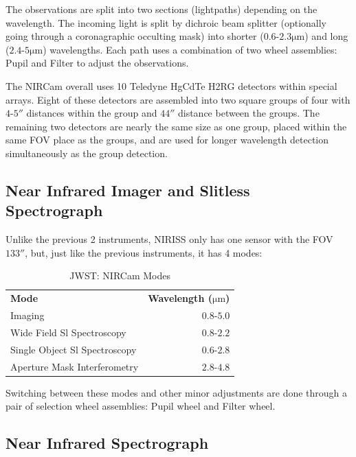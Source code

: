 The observations are split into two sections (lightpaths) depending on the wavelength. The incoming light is split by dichroic beam splitter (optionally going through a coronagraphic occulting mask) into shorter ($0.6 \text{-} 2.3 \unit{\micro\meter}$) and long ($2.4 \text{-} 5 \unit{\micro\meter}$) wavelengths. Each path uses a combination of two wheel assemblies: Pupil and Filter to adjust the observations.

The NIRCam overall uses 10 Teledyne HgCdTe H2RG detectors within special arrays. Eight of these detectors are assembled into two square groups of four with $4\text{-}5''$ distances within the group and $44''$ distance between the groups. The remaining two detectors are nearly the same size as one group, placed within the same FOV place as the groups, and are used for longer wavelength detection simultaneously as the group detection.

\subsection{Near Infrared Imager and Slitless Spectrograph}

Unlike the previous 2 instruments, NIRISS only has one sensor with the FOV $133''$, but, just like the previous instruments, it has 4 modes:

\begin{table}[h]
    \centering
    \begin{tabular}{lr}
        \textbf{Mode} & \textbf{Wavelength ($\unit{\micro\meter}$)}  \\
        Imaging & $0.8 \text{-} 5.0$ \\
        Wide Field Sl Spectroscopy & $0.8 \text{-} 2.2$ \\
        Single Object Sl Spectroscopy & $0.6 \text{-} 2.8$ \\
        Aperture Mask Interferometry  & $2.8 \text{-} 4.8$ \\
    \end{tabular}
    \caption{JWST: NIRCam Modes \cite{JWST_NIRISS}}
    \label{tab:jwst_ote_information}
\end{table}

Switching between these modes and other minor adjustments are done through a pair of selection wheel assemblies: Pupil wheel and Filter wheel.

\subsection{Near Infrared Spectrograph}


